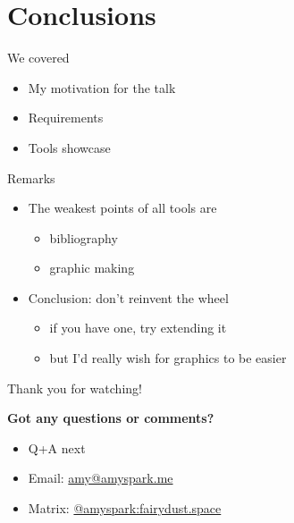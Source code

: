 \documentclass[aspectratio=169]{divoc}
\begin{document}
\section*{Conclusions}
\begin{frame}{We covered}
  \begin{itemize}
    \item My motivation for the talk
    \item Requirements
    \item Tools showcase
  \end{itemize}
\end{frame}
\begin{frame}{Remarks}
  \begin{itemize}
    \item The weakest points of all tools are
          \begin{itemize}
            \item bibliography
            \item graphic making
          \end{itemize}
    \item Conclusion: don't reinvent the wheel
          \begin{itemize}
            \item if you have one, try extending it
            \item but I'd really wish for graphics to be easier
          \end{itemize}
  \end{itemize}
\end{frame}
\begin{frame}{Thank you for watching!}
  \begin{center}
    {
      \large
      \textbf{Got any questions or comments?}
    }
    \begin{itemize}[<*>]
      \item Q+A next
      \item Email: \href{mailto:amy@amyspark.me?subject="DiVOC 2022"}{amy@amyspark.me}
      \item Matrix: \href{https://matrix.to/\#/@amyspark:fairydust.space}{@amyspark:fairydust.space}
    \end{itemize}
  \end{center}
\end{frame}
\end{document}
